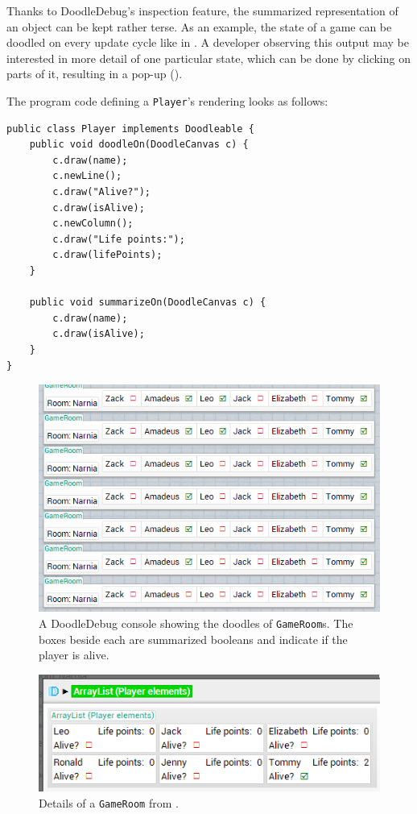 \documentclass[english]{scrartcl}
\newcommand{\DD}{Dood\-le\-De\-bug\xspace}
\begin{document}
Thanks to \DD's inspection feature, the summarized representation of an object can be kept rather terse.
As an example, the state of a game can be doodled on every update cycle like in .
A developer observing this output may be interested in more detail of one particular state, which can be done by clicking on parts of it, resulting in a pop-up ().

The program code defining a \texttt{Player}'s rendering looks as follows:
\begin{lstlisting}
public class Player implements Doodleable {
	public void doodleOn(DoodleCanvas c) {
		c.draw(name);
		c.newLine();
		c.draw("Alive?");
		c.draw(isAlive);
		c.newColumn();
		c.draw("Life points:");
		c.draw(lifePoints);
	}

	public void summarizeOn(DoodleCanvas c) {
		c.draw(name);
		c.draw(isAlive);
	}
}
\end{lstlisting}

\begin{figure}[h]
	\includegraphics[width=\linewidth]{img/game_long-list.png}
	\caption[Example of a chronological sequence: Game]{A DoodleDebug console showing the doodles of \texttt{GameRoom}s. The boxes beside each are summarized booleans and indicate if the player is alive.}
\end{figure}

\begin{figure}[h]
	\centering
	\includegraphics{img/game_last-state.png}
	\caption[Example of a chronological sequence: Detailed player list]{Details of a \texttt{GameRoom} from .}
\end{figure}
\end{document}
